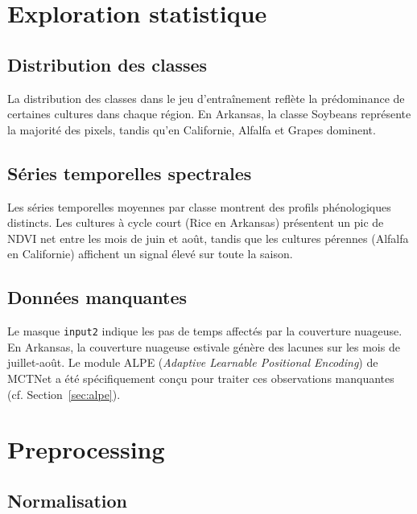 \section{Exploration statistique}

\subsection{Distribution des classes}

La distribution des classes dans le jeu d'entraînement reflète la
prédominance de certaines cultures dans chaque région. En Arkansas, la
classe Soybeans représente la majorité des pixels, tandis qu'en Californie,
Alfalfa et Grapes dominent.


\subsection{Séries temporelles spectrales}

Les séries temporelles moyennes par classe montrent des profils phénologiques
distincts. Les cultures à cycle court (Rice en Arkansas) présentent un pic de
NDVI net entre les mois de juin et août, tandis que les cultures pérennes
(Alfalfa en Californie) affichent un signal élevé sur toute la saison.

\subsection{Données manquantes}

Le masque \texttt{input2} indique les pas de temps affectés par la couverture
nuageuse. En Arkansas, la couverture nuageuse estivale génère des lacunes sur
les mois de juillet-août. Le module ALPE (\textit{Adaptive Learnable
Positional Encoding}) de MCTNet a été spécifiquement conçu pour traiter ces
observations manquantes (cf. Section~\ref{sec:alpe}).

\section{Preprocessing}

\subsection{Normalisation}

